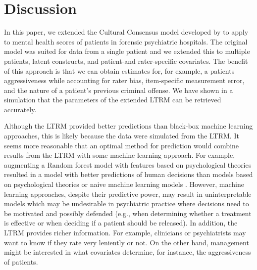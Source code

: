 \documentclass[a4paper,usenames,dvipsnames]{article}
\newenvironment{revision}{\color{teal}}{\color{black}}
\begin{document}
\section*{Discussion}

In this paper, we extended the Cultural Consensus model developed by  to apply to mental health scores of patients in forensic psychiatric hospitals. The original model was suited for data from a single patient and we extended this to multiple patients, latent constructs, and patient-and rater-specific covariates. The benefit of this approach is that we can obtain estimates for, for example, a patients aggressiveness while accounting for rater bias, item-specific measurement error, and the nature of a patient's previous criminal offense. We have shown in a simulation that the parameters of the extended LTRM can be retrieved accurately.

Although the LTRM provided better predictions than black-box machine learning approaches, this is likely because the data were simulated from the LTRM. It seems more reasonable that an optimal method for prediction would combine results from the LTRM with some machine learning approach. For example, augmenting a Random forest model with features based on psychological theories resulted in a model with better predictions of human decisions than models based on psychological theories or naive machine learning models \cite{plonsky2019predicting, plonsky2017psychological}. However, machine learning approaches, despite their predictive power, may result in uninterpretable models which may be undesirable in psychiatric practice where decisions need to be motivated and possibly defended (e.g., when determining whether a treatment is effective or when deciding if a patient should be released). \begin{revision}In addition, the LTRM provides richer information. For example, clinicians or psychiatrists may want to know if they rate very leniently or not. On the other hand, management might be interested in what covariates determine, for instance, the aggressiveness of patients.\end{revision}
\end{document}
